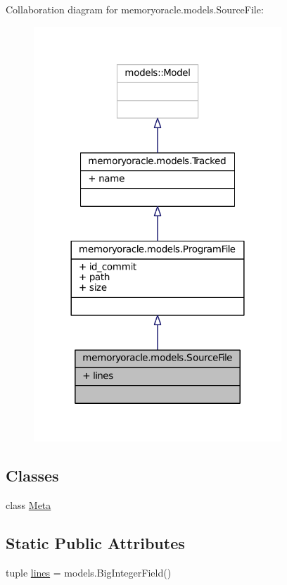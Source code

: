 Collaboration diagram for memoryoracle.\+models.\+Source\+File\+:\nopagebreak
\begin{figure}[H]
\begin{center}
\leavevmode
\includegraphics[width=264pt]{classmemoryoracle_1_1models_1_1SourceFile__coll__graph}
\end{center}
\end{figure}
\subsection*{Classes}
\begin{DoxyCompactItemize}
\item 
class \hyperlink{classmemoryoracle_1_1models_1_1SourceFile_1_1Meta}{Meta}
\end{DoxyCompactItemize}
\subsection*{Static Public Attributes}
\begin{DoxyCompactItemize}
\item 
tuple \hyperlink{classmemoryoracle_1_1models_1_1SourceFile_a67c7948f0afb40167c0474afb6ac59c5}{lines} = models.\+Big\+Integer\+Field()
\end{DoxyCompactItemize}


